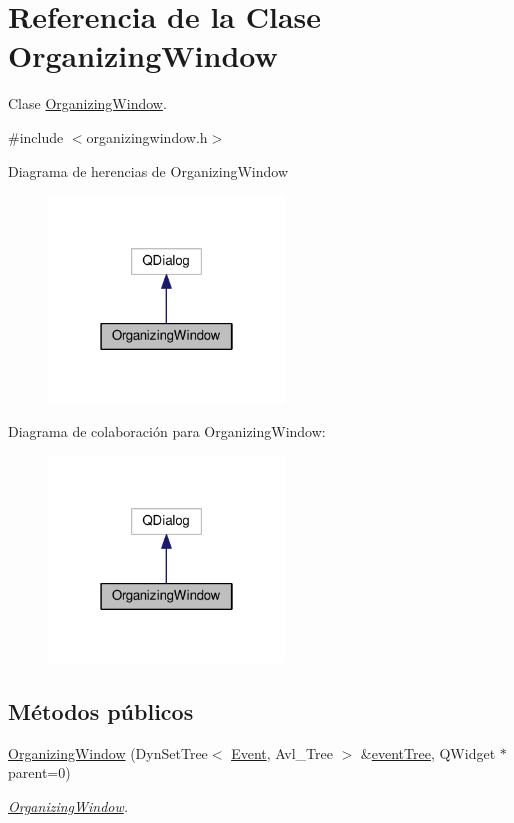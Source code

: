 \hypertarget{class_organizing_window}{}\section{Referencia de la Clase Organizing\+Window}
\label{class_organizing_window}


Clase \hyperlink{class_organizing_window}{Organizing\+Window}.  




{\ttfamily \#include $<$organizingwindow.\+h$>$}



Diagrama de herencias de Organizing\+Window\nopagebreak
\begin{figure}[H]
\begin{center}
\leavevmode
\includegraphics[width=178pt]{class_organizing_window__inherit__graph}
\end{center}
\end{figure}


Diagrama de colaboración para Organizing\+Window\+:\nopagebreak
\begin{figure}[H]
\begin{center}
\leavevmode
\includegraphics[width=178pt]{class_organizing_window__coll__graph}
\end{center}
\end{figure}
\subsection*{Métodos públicos}
\begin{DoxyCompactItemize}
\item 
\hyperlink{class_organizing_window_ac364fadd69b47d7ce67af56b8019c896}{Organizing\+Window} (Dyn\+Set\+Tree$<$ \hyperlink{class_event}{Event}, Avl\+\_\+\+Tree $>$ \&\hyperlink{class_organizing_window_a2658600a27160da36da9a20584300aac}{event\+Tree}, Q\+Widget $\ast$parent=0)
\begin{DoxyCompactList}\small\item\em \hyperlink{class_organizing_window}{Organizing\+Window}. \end{DoxyCompactList}\end{DoxyCompactItemize}
